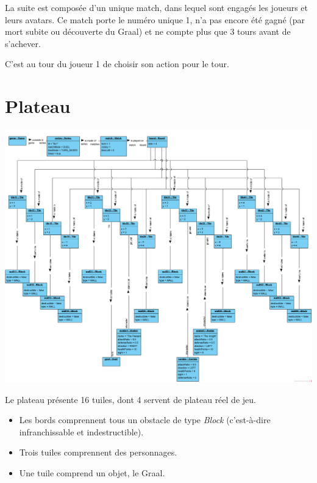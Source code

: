 \documentclass[oneside,a4paper]{book}
\begin{document}
La suite est composée d'un unique match, dans lequel sont engagés les joueurs et leurs avatars. Ce match porte le numéro unique 1, n'a pas encore été gagné (par mort subite ou découverte du Graal) et ne compte plus que 3 tours avant de s'achever.\newline

C'est au tour du joueur 1 de choisir son action pour le tour.\newline

\section{Plateau}
\includegraphics[width=\textheight,height=\textwidth,keepaspectratio,angle=90,origin=c]{Diagrams/OD-Board.png}\newline

Le plateau présente 16 tuiles, dont 4 servent de plateau réel de jeu.
\begin{itemize}
    \item Les bords comprennent tous un obstacle de type \textit{Block} (c'est-à-dire infranchissable et indestructible).
    \item Trois tuiles comprennent des personnages.
    \item Une tuile comprend un objet, le Graal.
\end{itemize}
\end{document}
